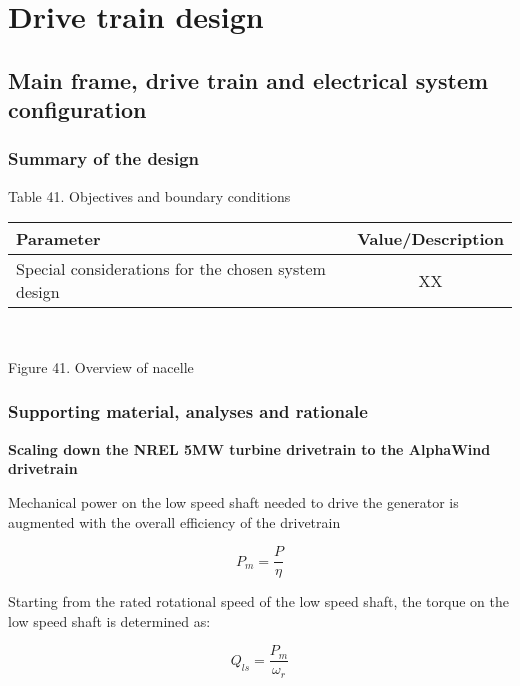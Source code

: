 \section{Drive train design}

\subsection{Main frame, drive train and electrical system configuration}

\subsubsection{Summary of the design}

\begin{center}
Table 41. Objectives and boundary conditions\\
\begin{tabular}{ |l|c| } 
\hline
\textbf{Parameter} & \textbf{Value/Description}  \\ 
\hline
Special considerations for the chosen system design & XX  \\ 
\hline
\end{tabular} \\
\end{center}



Figure 41. Overview of nacelle

\subsubsection{Supporting material, analyses and rationale}

\textbf{Scaling down the NREL 5MW turbine drivetrain to the AlphaWind drivetrain}

Mechanical power on the low speed shaft needed to drive the generator is augmented with the overall efficiency of the drivetrain 

\begin{equation}
    P_m = \dfrac{P}{\eta}
    \label{eq:P_m}
\end{equation}


Starting from the rated rotational speed of the low speed shaft, the torque on the low speed shaft is determined as: 

\begin{equation}
    Q_{ls} = \dfrac{P_{m}}{\omega_r}
    \label{eq:Q_ls}
\end{equation}


\newpage

